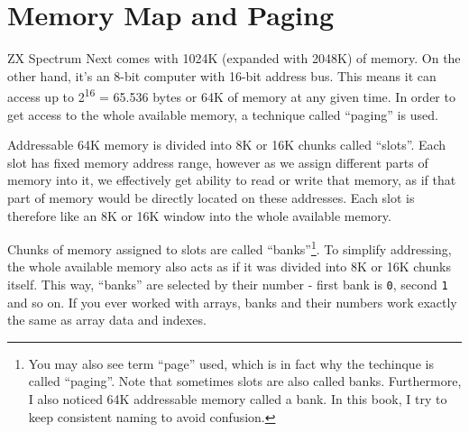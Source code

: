 \section{Memory Map and Paging}
\label{zx_next_memorypaging}


\newcommand{\MemEmpty}{\multicolumn{1}{c}{}}
\newcommand{\MemArrow}[1]{\multicolumn{1}{c}{\IfEq{#1}{<}{\LArrowLine{1em}}{\RArrowLine{1em}}}}

ZX Spectrum Next comes with 1024K (expanded with 2048K) of memory. On the other hand, it's an 8-bit computer with 16-bit address bus. This means it can access up to 2\textsuperscript{16} = 65.536 bytes or 64K of memory at any given time. In order to get access to the whole available memory, a technique called ``paging'' is used. 

Addressable 64K memory is divided into 8K or 16K chunks called ``slots''. Each slot has fixed memory address range, however as we assign different parts of memory into it, we effectively get ability to read or write that memory, as if that part of memory would be directly located on these addresses. Each slot is therefore like an 8K or 16K window into the whole available memory.

Chunks of memory assigned to slots are called ``banks''\footnote{You may also see term ``page'' used, which is in fact why the techinque is called ``paging''. Note that sometimes slots are also called banks. Furthermore, I also noticed 64K addressable memory called a bank. In this book, I try to keep consistent naming to avoid confusion.}. To simplify addressing, the whole available memory also acts as if it was divided into 8K or 16K chunks itself. This way, ``banks'' are selected by their number - first bank is {\tt 0}, second {\tt 1} and so on. If you ever worked with arrays, banks and their numbers work exactly the same as array data and indexes.

